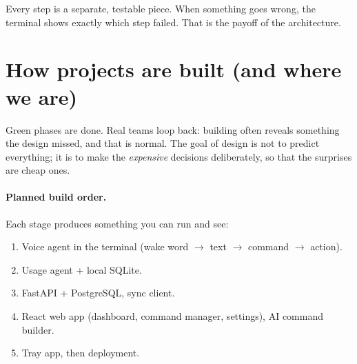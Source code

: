 \documentclass[11pt,a4paper]{article}
\begin{document}
\noindent Every step is a separate, testable piece. When something goes wrong, the terminal
shows exactly which step failed. That is the payoff of the architecture.

\section{How projects are built (and where we are)}

\begin{center}
\end{center}

\noindent Green phases are done. Real teams loop back: building often reveals something the
design missed, and that is normal. The goal of design is not to predict everything; it is to
make the \emph{expensive} decisions deliberately, so that the surprises are cheap ones.

\paragraph{Planned build order.} Each stage produces something you can run and see:
\begin{enumerate}[nosep]
  \item Voice agent in the terminal (wake word $\to$ text $\to$ command $\to$ action).
  \item Usage agent + local SQLite.
  \item FastAPI + PostgreSQL, sync client.
  \item React web app (dashboard, command manager, settings), AI command builder.
  \item Tray app, then deployment.
\end{enumerate}
\end{document}
